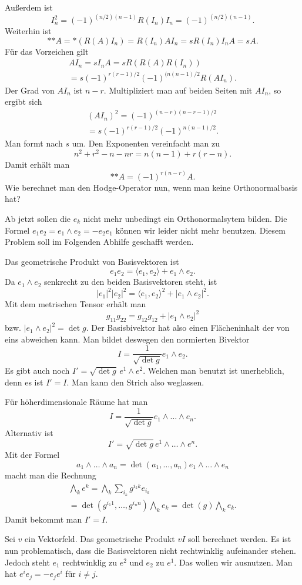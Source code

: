 \documentclass[a4paper,10pt,fleqn,twocolumn,twoside]{article}
\begin{document}
Außerdem ist
\[I_n^2 = (-1)^{(n/2)(n-1)} R(I_n)I_n = (-1)^{(n/2)(n-1)}.\]
Weiterhin ist
\[*{*A} = *(R(A)I_n) = R(I_n)AI_n = sR(I_n)I_nA = sA.
\]
Für das Vorzeichen gilt
\begin{gather*}
AI_n = sI_nA = sR(R(A)R(I_n))\\
= s(-1)^{r(r-1)/2}(-1)^{(n(n-1)/2} R(AI_n).
\end{gather*}
Der Grad von \(AI_n\) ist \(n-r\).
Multipliziert man auf beiden Seiten mit \(AI_n\), so ergibt sich
\begin{gather*}
(AI_n)^2 = (-1)^{(n-r)(n-r-1)/2}\\
= s(-1)^{r(r-1)/2}(-1)^{n(n-1)/2}.
\end{gather*}
Man formt nach \(s\) um. Den Exponenten vereinfacht man zu
\[n^2+r^2-n-nr = n(n-1) + r(r-n).\]
Damit erhält man
\[*{*A} = (-1)^{r(n-r)}A.\]
Wie berechnet man den Hodge-Operator nun, wenn man keine
Orthonormalbasis hat?

Ab jetzt sollen die \(e_k\) nicht mehr unbedingt ein Orthonormalsytem
bilden. Die Formel \(e_1e_2=e_1\wedge e_2=-e_2e_1\) können wir leider
nicht mehr benutzen. Diesem Problem soll im Folgenden Abhilfe
geschafft werden.

Das geometrische Produkt von Basisvektoren ist
\[e_1e_2 = \langle e_1,e_2\rangle + e_1\wedge e_2.\]
Da \(e_1\wedge e_2\) senkrecht zu den beiden Basisvektoren steht, ist
\[|e_1|^2|e_2|^2 = \langle e_1,e_2\rangle^2+|e_1\wedge e_2|^2.\]
Mit dem metrischen Tensor erhält man
\[g_{11} g_{22} = g_{12} g_{12} + |e_1\wedge e_2|^2\]
bzw. \(|e_1\wedge e_2|^2 = \det g.\)
Der Basisbivektor hat also einen Flächeninhalt der von eins abweichen
kann. Man bildet deswegen den normierten Bivektor
\[I = \frac{1}{\sqrt{\det g}}e_1\wedge e_2.\]
Es gibt auch noch \(I'=\sqrt{\det g}\,e^1\wedge e^2\). Welchen man
benutzt ist unerheblich, denn es ist \(I'=I\). Man kann den Strich
also weglassen.

Für höherdimensionale Räume hat man
\[I = \frac{1}{\sqrt{\det g}}e_1\wedge\ldots\wedge e_n.\]
Alternativ ist
\[I' = \sqrt{\det g}\,e^1\wedge\ldots\wedge e^n.\]
Mit der Formel
\[a_1\wedge\ldots\wedge a_n
= \det(a_1,\ldots,a_n)e_1\wedge\ldots\wedge e_n\]
macht man die Rechnung
\begin{gather*}
\bigwedge_k e^k
= \bigwedge_k \sum_{i_k} g^{{i_k}k} e_{i_k}\\
= \det(g^{{i_1}1},\ldots,g^{{i_n}n})\bigwedge_k e_k
= \det(g)\bigwedge_k e_k.
\end{gather*}
Damit bekommt man \(I'=I\).

Sei \(v\) ein Vektorfeld. Das geometrische Produkt \(vI\)
soll berechnet werden. Es ist nun problematisch, dass die
Basisvektoren nicht rechtwinklig aufeinander stehen. Jedoch
steht \(e_1\) rechtwinklig zu \(e^2\) und \(e_2\) zu \(e^1\).
Das wollen wir ausnutzen. Man hat \(e^ie_j=-e_je^i\) für \(i\ne j\).
\end{document}
